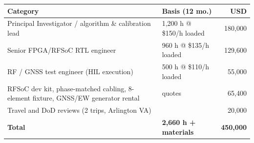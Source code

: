 \documentclass[12pt,letterpaper]{article}
\begin{document}
\vspace{4pt}
\begin{tabular}{@{}p{2.9in}p{1.75in}r@{}}
\toprule
\textbf{Category} & \textbf{Basis (12 mo.)} & \textbf{USD} \\
\midrule
Principal Investigator / algorithm \& calibration lead & 1,200 h @ \$150/h loaded & 180,000 \\
Senior FPGA/RFSoC RTL engineer & 960 h @ \$135/h loaded & 129,600 \\
RF / GNSS test engineer (HIL execution) & 500 h @ \$110/h loaded & 55,000 \\
RFSoC dev kit, phase-matched cabling, 8-element fixture, GNSS/EW generator rental & quotes & 65,400 \\
Travel and DoD reviews (2 trips, Arlington VA) & & 20,000 \\
\midrule
\textbf{Total} & \textbf{2,660 h + materials} & \textbf{450,000} \\
\bottomrule
\end{tabular}
\end{document}
